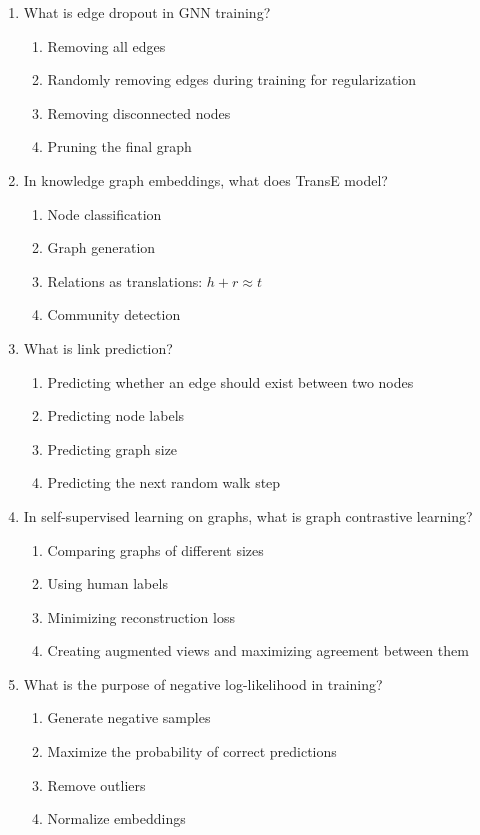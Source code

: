 \documentclass[12pt,a4paper]{article}
\begin{document}
\begin{enumerate}
\item What is edge dropout in GNN training?
\begin{enumerate}[label=\Alph*)]
    \item Removing all edges
    \item Randomly removing edges during training for regularization
    \item Removing disconnected nodes
    \item Pruning the final graph
\end{enumerate}

\item In knowledge graph embeddings, what does TransE model?
\begin{enumerate}[label=\Alph*)]
    \item Node classification
    \item Graph generation
    \item Relations as translations: $h + r \approx t$
    \item Community detection
\end{enumerate}

\item What is link prediction?
\begin{enumerate}[label=\Alph*)]
    \item Predicting whether an edge should exist between two nodes
    \item Predicting node labels
    \item Predicting graph size
    \item Predicting the next random walk step
\end{enumerate}

\item In self-supervised learning on graphs, what is graph contrastive learning?
\begin{enumerate}[label=\Alph*)]
    \item Comparing graphs of different sizes
    \item Using human labels
    \item Minimizing reconstruction loss
    \item Creating augmented views and maximizing agreement between them
\end{enumerate}

\item What is the purpose of negative log-likelihood in training?
\begin{enumerate}[label=\Alph*)]
    \item Generate negative samples
    \item Maximize the probability of correct predictions
    \item Remove outliers
    \item Normalize embeddings
\end{enumerate}


\end{enumerate}
\end{document}
